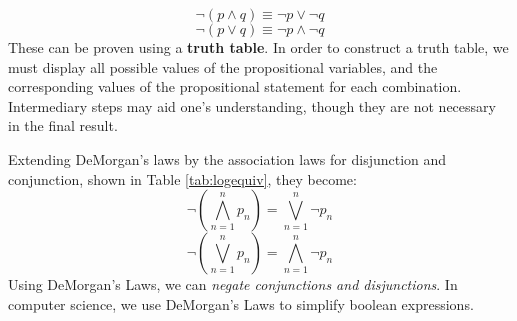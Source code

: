 \begin{defn}
\begin{equation}
  \neg (p \land q) \equiv \neg p \lor \neg q
\end{equation}
\begin{equation}
  \neg(p \lor q) \equiv \neg p \land \neg q
\end{equation}
These can be proven using a \textbf{truth table}.
In order to construct a truth table, we must display all possible values of the propositional variables,
and the corresponding values of the propositional statement for each combination.
Intermediary steps may aid one's understanding, though they are not necessary in the final result.
\begin{table}[H]
  \centering
  \caption{A proof of DeMorgan's first law.}
\end{table}
\begin{table}[H]
  \centering
  \caption{A proof of DeMorgan's second law.}
\end{table}

Extending DeMorgan's laws by the association laws for disjunction and conjunction, shown in Table \ref{tab:logequiv}, they become:
\begin{equation}
 \neg\left(\bigwedge^n_{n=1} p_n\right)=\bigvee^n_{n=1} \neg p_n
\end{equation}
\begin{equation}
 \neg\left(\bigvee^n_{n=1} p_n\right)=\bigwedge^n_{n=1} \neg p_n
\end{equation}
Using DeMorgan's Laws, we can \emph{negate conjunctions and disjunctions}.
In computer science, we use DeMorgan's Laws to simplify boolean expressions.


\end{defn}
